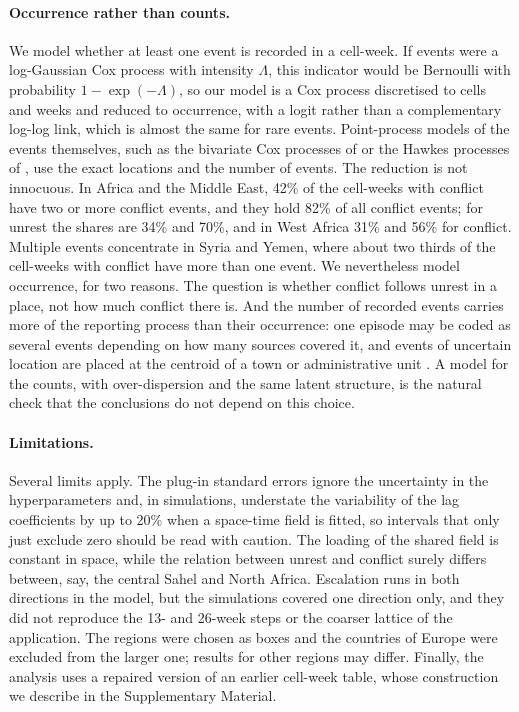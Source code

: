 \paragraph{Occurrence rather than counts.} We model whether at least one event is
recorded in a cell-week. If events were a log-Gaussian Cox process with intensity
$\Lambda$, this indicator would be Bernoulli with probability $1 - \exp(-\Lambda)$, so our
model is a Cox process discretised to cells and weeks and reduced to occurrence, with a
logit rather than a complementary log-log link, which is almost the same for rare events.
Point-process models of the events themselves, such as the bivariate Cox processes of
\citet{zhu2021promise} or the Hawkes processes of \citet{jun2024hawkes}, use the exact
locations and the number of events. The reduction is not innocuous. In Africa and the
Middle East, 42\% of the cell-weeks with conflict have two or more conflict events, and
they hold 82\% of all conflict events; for unrest the shares are 34\% and 70\%, and in
West Africa 31\% and 56\% for conflict. Multiple events concentrate in Syria and Yemen,
where about two thirds of the cell-weeks with conflict have more than one event. We
nevertheless model occurrence, for two reasons. The question is whether conflict follows
unrest in a place, not how much conflict there is. And the number of recorded events
carries more of the reporting process than their occurrence: one episode may be coded as
several events depending on how many sources covered it, and events of uncertain location
are placed at the centroid of a town or administrative unit \citep{zhu2021promise}. A
model for the counts, with over-dispersion and the same latent structure, is the natural
check that the conclusions do not depend on this choice.

\paragraph{Limitations.} Several limits apply. The plug-in standard errors ignore the
uncertainty in the hyperparameters and, in simulations, understate the variability of
the lag coefficients by up to 20\% when a space-time field is fitted, so intervals
that only just exclude zero should be read with caution. The loading of the shared
field is constant in space, while the relation between unrest and conflict surely
differs between, say, the central Sahel and North Africa. Escalation runs in both
directions in the model, but the simulations covered one direction only, and they
did not reproduce the 13- and 26-week steps or the coarser lattice of the application.
The regions were chosen as boxes and the countries of Europe were excluded from the
larger one; results for other regions may differ. Finally, the analysis uses a
repaired version of an earlier cell-week table, whose construction we describe in the
Supplementary Material.

